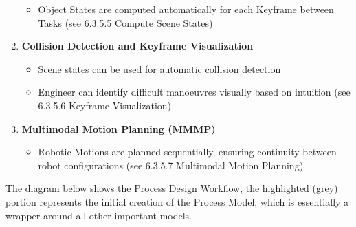 \begin{enumerate}
\begin{itemize}
	\item Object States are computed automatically for each Keyframe between Tasks (see 6.3.5.5 Compute Scene States)

\end{itemize}
	\item \textbf{Collision Detection and Keyframe Visualization}

\begin{itemize}
	\item Scene states can be used for automatic collision detection

	\item Engineer can identify difficult manoeuvres visually based on intuition (see 6.3.5.6 Keyframe Visualization)

\end{itemize}

    \item \textbf{Multimodal Motion Planning (MMMP)}

\begin{itemize}
	\item Robotic Motions are planned sequentially, ensuring continuity between robot configurations (see 6.3.5.7 Multimodal Motion Planning)

\end{itemize}
\end{enumerate}

The diagram below shows the Process Design Workflow, the highlighted (grey) portion represents the initial creation of the Process Model, which is essentially a wrapper around all other important models. 





